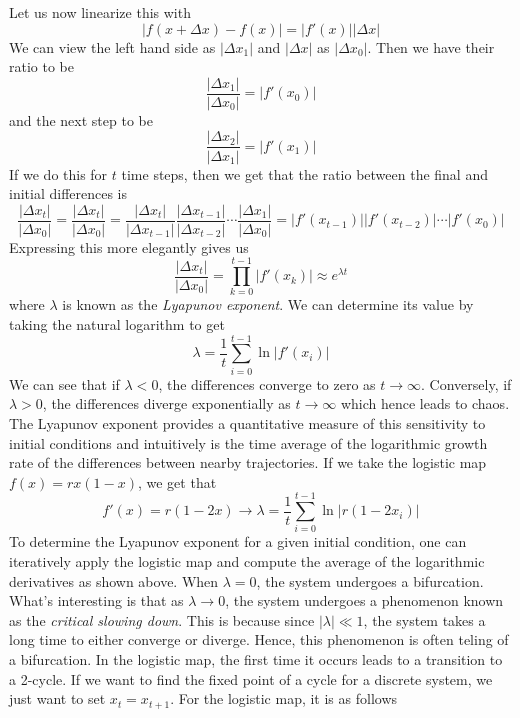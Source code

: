 \documentclass{article}
\theoremstyle{definition}
\begin{document}
Let us now linearize this with 
\begin{equation*}
    |f(x+\Delta x)-f(x)|= |f'(x)| |\Delta x|
\end{equation*}
We can view the left hand side as $|\Delta x_1|$ and $|\Delta x|$ as $|\Delta x_0|$. Then we have their ratio to be 
\begin{equation*}
    \frac{|\Delta x_1|}{|\Delta x_0|} = |f'(x_0)|
\end{equation*}
and the next step to be 
\begin{equation*}
    \frac{|\Delta x_2|}{|\Delta x_1|} = |f'(x_1)|
\end{equation*}
If we do this for $t$ time steps, then we get that the ratio between the final and initial differences is
\begin{equation*}
    \frac{|\Delta x_t|}{|\Delta x_0|} = \frac{|\Delta x_t|}{|\Delta x_0|} = \frac{|\Delta x_t|}{|\Delta x_{t-1}|} \frac{|\Delta x_{t-1}|}{|\Delta x_{t-2}|} \cdots \frac{|\Delta x_1|}{|\Delta x_0|} = |f'(x_{t-1})| |f'(x_{t-2})| \cdots |f'(x_0)|
\end{equation*}
Expressing this more elegantly gives us 
\begin{equation*}
    \frac{|\Delta x_t|}{|\Delta x_0|} = \prod_{k=0}^{t-1} |f'(x_k)| \approx e^{\lambda t}
\end{equation*}
where $\lambda$ is known as the \emph{Lyapunov exponent}. We can determine its value by taking the natural logarithm to get 
\begin{equation*}
    \lambda = \frac{1}{t} \sum^{t-1}_{i=0} \ln |f'(x_i)|
\end{equation*}
We can see that if $\lambda <0$, the differences converge to zero as $t \to \infty$. Conversely, if $\lambda >0$, the differences diverge exponentially as $t \to \infty$ which hence leads to chaos. The Lyapunov exponent provides a quantitative measure of this sensitivity to initial conditions and intuitively is the time average of the logarithmic growth rate of the differences between nearby trajectories. If we take the logistic map $f(x) = r x (1-x)$, we get that 
\begin{equation*}
    f'(x) = r (1-2x) \to \lambda = \frac{1}{t} \sum^{t-1}_{i=0} \ln |r (1-2x_i)|
\end{equation*}
To determine the Lyapunov exponent for a given initial condition, one can iteratively apply the logistic map and compute the average of the logarithmic derivatives as shown above. When $\lambda = 0$, the system undergoes a bifurcation. What's interesting is that as $\lambda \to 0$, the system undergoes a phenomenon known as the \emph{critical slowing down}. This is because since $|\lambda| \ll 1$, the system takes a long time to either converge or diverge. Hence, this phenomenon is often teling of a bifurcation. In the logistic map, the first time it occurs leads to a transition to a 2-cycle. If we want to find the fixed point of a cycle for a discrete system, we just want to set $x_t = x_{t+1}$. For the logistic map, it is as follows
\end{document}
